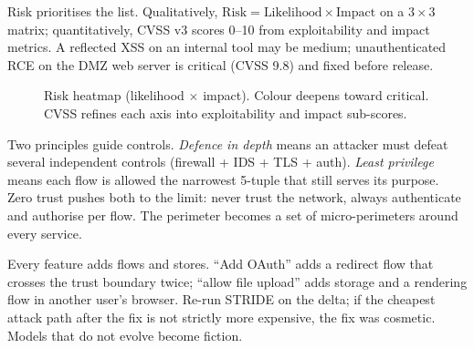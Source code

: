 Risk prioritises the list. Qualitatively,
$\text{Risk}=\text{Likelihood}\times\text{Impact}$ on a $3\times3$ matrix;
quantitatively, CVSS v3 scores 0--10 from exploitability and impact metrics.
A reflected XSS on an internal tool may be medium; unauthenticated RCE on the
DMZ web server is critical (CVSS 9.8) and fixed before release.

\begin{figure}[h]\centering
{}
\caption{Risk heatmap (likelihood $\times$ impact). Colour deepens toward critical. CVSS refines each axis into exploitability and impact sub-scores.}
\label{fig:risk}
\end{figure}

Two principles guide controls. \emph{Defence in depth} means an attacker must
defeat several independent controls (firewall + IDS + TLS + auth). \emph{Least
privilege} means each flow is allowed the narrowest 5-tuple that still serves
its purpose. Zero trust pushes both to the limit: never trust the network,
always authenticate and authorise per flow. The perimeter becomes a set of
micro-perimeters around every service.

\begin{remark}\label{rem:iter}
Every feature adds flows and stores. ``Add OAuth'' adds a redirect flow that
crosses the trust boundary twice; ``allow file upload'' adds storage and a
rendering flow in another user's browser. Re-run STRIDE on the delta; if the
cheapest attack path after the fix is not strictly more expensive, the fix was
cosmetic. Models that do not evolve become fiction.
\end{remark}

